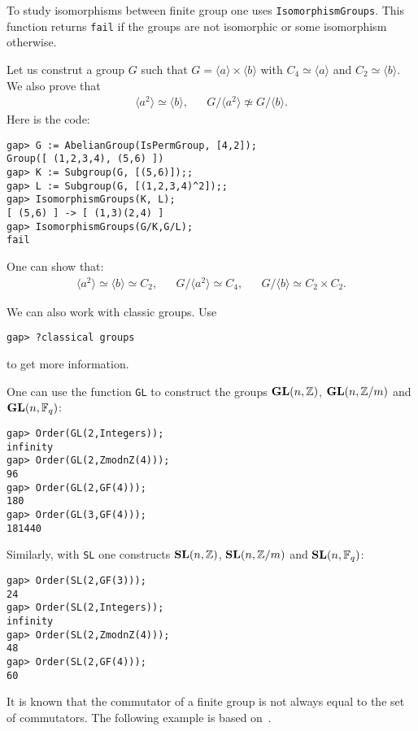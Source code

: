 To study isomorphisms between finite group one uses
\lstinline{IsomorphismGroups}. This function returns \lstinline{fail} if the
groups are not isomorphic or some isomorphism otherwise. 

\begin{example}
Let us construt a group $G$ such that $G=\langle a\rangle\times\langle
b\rangle$ with $C_4\simeq\langle a\rangle$ and $C_2\simeq\langle b\rangle$. We
also prove that 
\begin{align*}
\langle a^2\rangle\simeq\langle b\rangle,
&&
G/\langle a^2\rangle\not\simeq G/\langle b\rangle.
\end{align*}
Here is the code:
\begin{lstlisting}
gap> G := AbelianGroup(IsPermGroup, [4,2]);
Group([ (1,2,3,4), (5,6) ])
gap> K := Subgroup(G, [(5,6)]);;
gap> L := Subgroup(G, [(1,2,3,4)^2]);;
gap> IsomorphismGroups(K, L);
[ (5,6) ] -> [ (1,3)(2,4) ]
gap> IsomorphismGroups(G/K,G/L);
fail
\end{lstlisting}
One can show that:
\begin{align*}
\langle a^2\rangle\simeq\langle b\rangle\simeq C_2,
&&
G/\langle a^2\rangle\simeq C_4,
&&
G/\langle b\rangle\simeq C_2\times C_2.
\end{align*}
\end{example}

We can also work with classic groups. Use 
\begin{lstlisting}
gap> ?classical groups
\end{lstlisting}
to get more information.

\begin{example}
	One can use the function \lstinline{GL} to construct the groups
	$\mathbf{GL}(n,\mathbb{Z})$, $\mathbf{GL}(n,\mathbb{Z}/m)$ and $\mathbf{GL}(n,\mathbb{F}_q)$: 
\begin{lstlisting}
gap> Order(GL(2,Integers));
infinity
gap> Order(GL(2,ZmodnZ(4)));
96
gap> Order(GL(2,GF(4)));
180
gap> Order(GL(3,GF(4)));
181440
\end{lstlisting}
Similarly, with \lstinline{SL} one constructs 
$\mathbf{SL}(n,\mathbb{Z})$, $\mathbf{SL}(n,\mathbb{Z}/m)$ and 
$\mathbf{SL}(n,\mathbb{F}_q)$:
\begin{lstlisting}
gap> Order(SL(2,GF(3)));                                                  
24
gap> Order(SL(2,Integers));
infinity
gap> Order(SL(2,ZmodnZ(4)));
48
gap> Order(SL(2,GF(4)));
60
\end{lstlisting}
\end{example}

It is known that the commutator of a finite group is not always equal to the
set of commutators.  The following example is based on~\cite{MR0075938}. 

